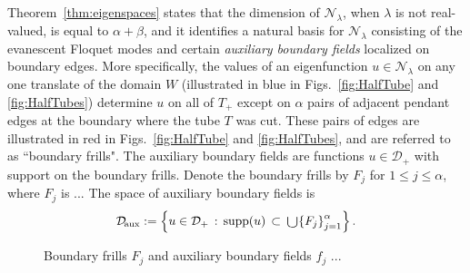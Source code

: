 \documentclass[12pt]{article}
\newcommand{\Dmax}{\mathcal{D}_+}
\newcommand{\Daux}{\mathcal{D}_\text{\!aux}}
\newcommand{\Nlambda}{{\mathcal N}_\lambda}
\newcommand{\supp}{\mathrm{supp}}
\begin{document}
Theorem~\ref{thm:eigenspaces} states that the dimension of $\Nlambda$, when $\lambda$ is not real-valued, is equal to $\alpha+\beta$, and it identifies a natural basis for $\Nlambda$ consisting of the evanescent Floquet modes and certain {\itshape auxiliary boundary fields} localized on boundary edges.  More specifically, the values of an eigenfunction $u\in\Nlambda$ on any one translate of the domain $W$ (illustrated in blue in Figs.~\ref{fig:HalfTube} and \ref{fig:HalfTubes}) determine $u$ on all of $T_+$ except on $\alpha$ pairs of adjacent pendant edges at the boundary where the tube $T$ was cut.  These pairs of edges are illustrated in red in Figs.~\ref{fig:HalfTube} and \ref{fig:HalfTubes}, and are referred to as ``boundary frills".  The auxiliary boundary fields are functions $u\in\Dmax$ with support on the boundary frills.
%
Denote the boundary frills by $F_j$ for $1\leq j\leq \alpha$,
%
%
where $F_j$ is ...
The space of auxiliary boundary fields is 
%
\begin{equation}
  \Daux := \left\{ u\in\Dmax \,:\, \supp(u) \,\subset\,\raisebox{-2pt}{\text{\Large$\cup$}}\! \left\{ F_j \right\}_{j=1}^{\alpha} \right\}.
\end{equation}
%


\begin{figure}   %
\centerline{}
\caption{\small Boundary frills $F_j$ and auxiliary boundary fields $f_j$ ...}
\label{fig:Frill}
\end{figure}
\end{document}
